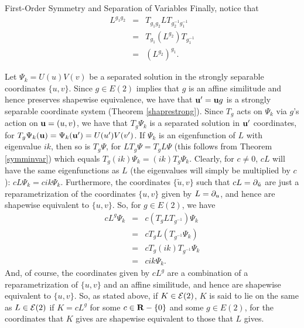 \begin{section}{First-Order Symmetry and Separation of Variables}
Finally, notice that
\begin{eqnarray*}
L^{g_1 g_2} & = & T_{g_1 g_2} L T_{g_2^{-1} g_1^{-1}} \\
 & = & T_{g_1} \left( L^{g_2} \right) T_{g_1^{-1}} \\
 & = & \left( L^{g_2} \right)^{g_1}.
\end{eqnarray*}

Let $\Psi_k = U(u)V(v)$ be a separated solution in the strongly separable coordinates $\{ u,v \}$.  Since $g \in E(2)$ implies that $g$ is an affine similitude and hence preserves shapewise equivalence, we have that $\mathbf{u}^\prime = \mathbf{u} g$ is a strongly separable coordinate system (Theorem \ref{shaprestrong}).  Since $T_g$ acts on $\Psi_k$ via $g$'s action on $\mathbf{u} = (u,v)$, we have that $T_g \Psi_k$ is a separated solution in $\mathbf{u}^\prime$ coordinates, for $T_g \Psi_k(\mathbf{u}) = \Psi_k(\mathbf{u}^\prime) = U(u^\prime)V(v^\prime)$.  If $\Psi_k$ is an eigenfunction of $L$ with eigenvalue $ik$, then so is $T_g \Psi$, for $L T_g \Psi = T_g L \Psi$ (this follows from Theorem \ref{symminvar}) which equals $T_g (ik) \Psi_k = (ik) T_g \Psi_k$.  Clearly, for $c \not= 0$, $cL$ will have the same eigenfunctions as $L$ (the eigenvalues will simply be multiplied by $c$): $cL \Psi_k = cik \Psi_k$.  Furthermore, the coordinates $\{ \tilde{u},v \}$ such that $cL = \partial_{\tilde{u}}$ are just a reparametrization of the coordinates $\{ u,v \}$ given by $L = \partial_{u}$, and hence are shapewise equivalent to $\{ u,v \}$.  So, for $g \in E(2)$, we have
\begin{eqnarray*}
cL^g \Psi_k & = & c \left( T_g L T_{g^{-1}} \right) \Psi_k \\
 & = & cT_g L \left( T_{g^{-1}} \Psi_k \right) \\
 & = & cT_g (ik) T_{g^{-1}} \Psi_k \\
 & = & cik \Psi_k.
\end{eqnarray*}
And, of course, the coordinates given by $c L^g$ are a combination of a reparametrization of $\{ u,v \}$ and an affine similitude, and hence are shapewise equivalent to $\{ u,v \}$.  So, as stated above, if $K \in \mathcal{E}(2)$, $K$ is said to lie on the same  as $L \in \mathcal{E}(2)$ if $K = cL^g$ for some $c \in \mathbf{R} - \{ 0 \}$ and some $g \in E(2)$, for the coordinates that $K$ gives are shapewise equivalent to those that $L$ gives.


\end{section}
